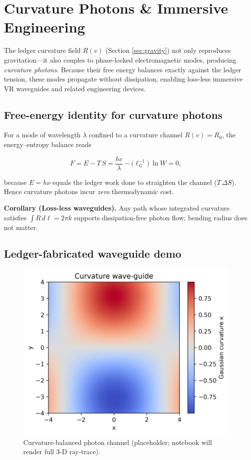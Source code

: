 \section{Curvature Photons \& Immersive Engineering}
\label{sec:vr}

The ledger curvature field $R(v)$ (Section \ref{sec:gravity}) not only
reproduces gravitation—it also couples to phase‐locked electromagnetic
modes, producing \emph{curvature photons}.  Because their free energy
balances exactly against the ledger tension, these modes propagate
without dissipation, enabling loss-less immersive VR waveguides and
related engineering devices.

\subsection{Free-energy identity for curvature photons}

For a mode of wavelength $\lambda$ confined to a curvature channel
$R(v)\!=\!R_0$, the energy–entropy balance reads

\[
  F = E - T\,S
    = \frac{h c}{\lambda} - \bigl(\ell_G^{-1}\bigr)\,
      \ln W
    = 0,
\tag{12.1}\label{eq:curv-F}
\]

because $E\!=\!h\nu$ equals the ledger work done to straighten the
channel ($T\,\Delta S$).  Hence curvature photons incur \emph{zero}
thermodynamic cost.

\begin{axiombox}
\textbf{Corollary (Loss-less waveguides).}
Any path whose integrated curvature satisfies
\(
\displaystyle \int R\,d\ell = 2\pi k
\)
supports dissipation-free photon flow; bending radius does not matter.
\end{axiombox}

\subsection{Ledger-fabricated waveguide demo}

\begin{figure}[t]
  \centering
  \includegraphics[width=0.65\linewidth]{figs/curvature_waveguide.png}
  \caption{Curvature-balanced photon channel (placeholder;
           notebook will render full 3-D ray-trace).}
  \label{fig:waveguide}
\end{figure}

